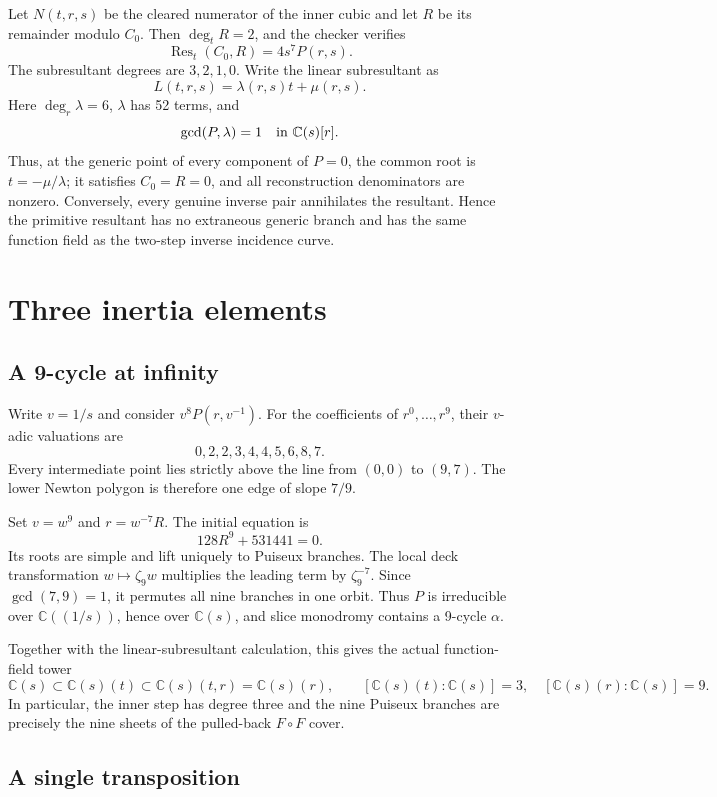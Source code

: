 \documentclass[11pt]{article}
\newcommand{\C}{\mathbb C}
\begin{document}
Let $N(t,r,s)$ be the cleared numerator of the inner cubic and let $R$ be its
remainder modulo $C_0$.  Then $\deg_tR=2$, and the checker verifies
\begin{equation}
\operatorname{Res}_t(C_0,R)=4s^7P(r,s).
\label{eq:reduced-resultant}
\end{equation}
The subresultant degrees are $3,2,1,0$.  Write the linear subresultant as
\[
L(t,r,s)=\lambda(r,s)t+\mu(r,s).
\]
Here $\deg_r\lambda=6$, $\lambda$ has 52 terms, and
\[
\gcd(P,\lambda)=1\quad\hbox{in }\C(s)[r].
\]
Thus, at the generic point of every component of $P=0$, the common root is
$t=-\mu/\lambda$; it satisfies $C_0=R=0$, and all reconstruction denominators
are nonzero.  Conversely, every genuine inverse pair annihilates the
resultant.  Hence the primitive resultant has no extraneous generic branch
and has the same function field as the two-step inverse incidence curve.

\section{Three inertia elements}

\subsection{A 9-cycle at infinity}

Write $v=1/s$ and consider $v^8P(r,v^{-1})$. For the coefficients of
$r^0,\ldots,r^9$, their $v$-adic valuations are
\[
0,2,2,3,4,4,5,6,8,7.
\]
Every intermediate point lies strictly above the line from $(0,0)$ to $(9,7)$.
The lower Newton polygon is therefore one edge of slope $7/9$.

Set $v=w^9$ and $r=w^{-7}R$. The initial equation is
\[
128R^9+531441=0.
\]
Its roots are simple and lift uniquely to Puiseux branches. The local deck
transformation $w\mapsto\zeta_9w$ multiplies the leading term by
$\zeta_9^{-7}$. Since $\gcd(7,9)=1$, it permutes all nine branches in one
orbit. Thus $P$ is irreducible over $\C((1/s))$, hence over $\C(s)$, and
slice monodromy contains a 9-cycle $\alpha$.

Together with the linear-subresultant calculation, this gives the actual
function-field tower
\[
\C(s)\subset\C(s)(t)\subset\C(s)(t,r)=\C(s)(r),
\qquad [\C(s)(t):\C(s)]=3,\quad[\C(s)(r):\C(s)]=9.
\]
In particular, the inner step has degree three and the nine Puiseux branches
are precisely the nine sheets of the pulled-back $F\circ F$ cover.

\subsection{A single transposition}
\end{document}
